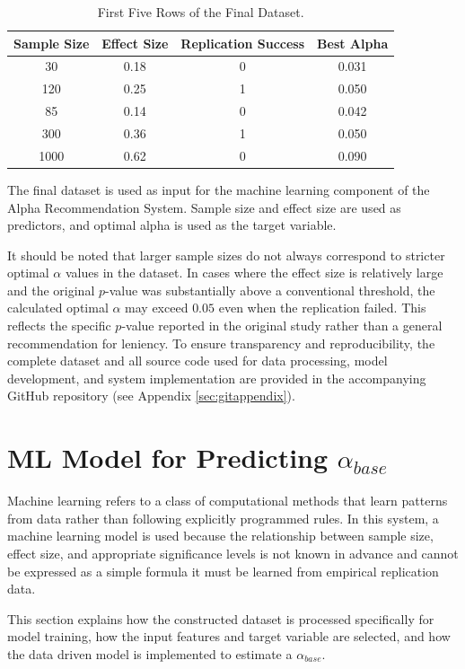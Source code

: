 {\begin{table}[ht]
	\centering
	\caption{First Five Rows of the Final Dataset.}
	\label{tab:dataset_example}
	\begin{tabular}{cccc}
		\hline
		Sample Size & Effect Size & Replication Success & Best Alpha \\
		\hline
		30   & 0.18 & 0 & 0.031 \\
		120  & 0.25 & 1 & 0.050 \\
		85   & 0.14 & 0 & 0.042 \\
		300  & 0.36 & 1 & 0.050 \\
		1000 & 0.62 & 0 & 0.090 \\
		\hline
	\end{tabular}
\end{table}

The final dataset is used as input for the machine learning component of the Alpha Recommendation System. Sample size and effect size are used as predictors, and optimal alpha is used as the target variable.

It should be noted that larger sample sizes do not always 
correspond to stricter optimal $\alpha$ values in the dataset. 
In cases where the effect size is relatively large and the 
original $p$-value was substantially above a conventional 
threshold, the calculated optimal $\alpha$ may exceed $0.05$ 
even when the replication failed. This reflects the specific 
$p$-value reported in the original study rather than a general 
recommendation for leniency.
To ensure transparency and reproducibility, the complete dataset and all source code used for data processing, model development, and system implementation are provided in the accompanying GitHub repository (see Appendix \ref{sec:gitappendix}).

\section{ML Model for Predicting $\alpha_{base}$ }
\label{sec:MLpart}
Machine learning refers to a class of computational methods that learn patterns from data rather than following explicitly programmed rules\cite{Jordan2015}. In this system, a machine learning model is used because the relationship between sample size, effect size, and appropriate significance levels is not known in advance and cannot be expressed as a simple formula it must be learned from empirical replication data.

This section explains how the constructed dataset is processed specifically for model training, how the input features and target variable are selected, and how the data driven model is implemented to estimate a $\alpha_{base}$.

}
